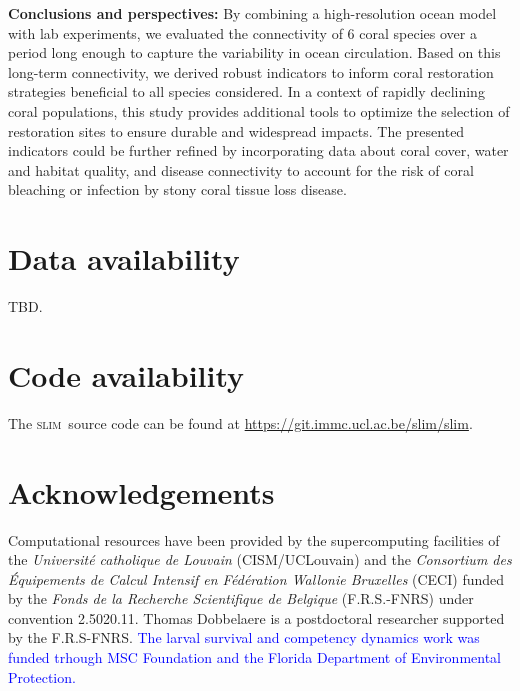 \documentclass[preprint,12pt,authoryear]{elsarticle}
\newcommand{\modif}[1]{\textcolor{blue}{#1}}
\newcommand{\slim}{\textsc{slim}\ }
\begin{document}
	
	\textbf{Conclusions and perspectives:} By combining a high-resolution ocean model with lab experiments, we evaluated the connectivity of 6 coral species over a period long enough to capture the variability in ocean circulation. Based on this long-term connectivity, we derived robust indicators to inform coral restoration strategies beneficial to all species considered. In a context of rapidly declining coral populations, this study provides additional tools to optimize the selection of restoration sites to ensure durable and widespread impacts. The presented indicators could be further refined by incorporating data about coral cover, water and habitat quality, and disease connectivity to account for the risk of coral bleaching or infection by stony coral tissue loss disease.
	
	
	\section*{Data availability}
	
	TBD.
	
	\section*{Code availability}
	
	The \slim source code can be found at \href{https://git.immc.ucl.ac.be/slim/slim}{https://git.immc.ucl.ac.be/slim/slim}.
	
	\section*{Acknowledgements}
	
	Computational resources have been provided by the supercomputing facilities of the \textit{Universit\'e catholique de Louvain} (CISM/UCLouvain) and the \textit{Consortium des \'Equipements de Calcul Intensif en F\'ed\'eration Wallonie Bruxelles} (CECI) funded by the \textit{Fonds de la Recherche Scientifique de Belgique} (F.R.S.-FNRS) under convention 2.5020.11. Thomas Dobbelaere is a postdoctoral researcher supported by the F.R.S-FNRS. \modif{The larval survival and competency dynamics work was funded trhough MSC Foundation and the Florida Department of Environmental Protection.}
	
\end{document}
